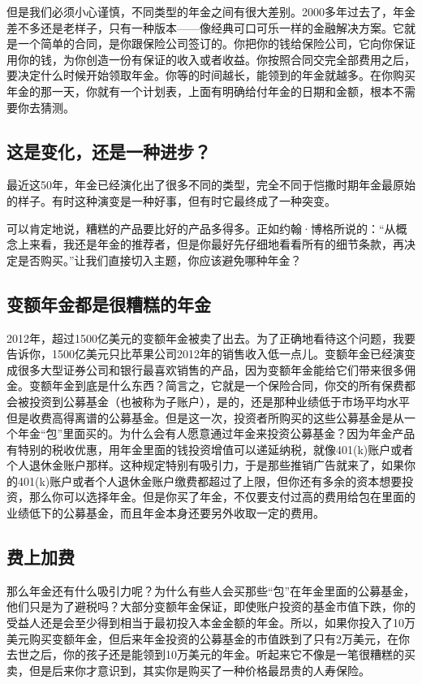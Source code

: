 但是我们必须小心谨慎，不同类型的年金之间有很大差别。2000多年过去了，年金差不多还是老样子，只有一种版本——像经典可口可乐一样的金融解决方案。它就是一个简单的合同，是你跟保险公司签订的。你把你的钱给保险公司，它向你保证用你的钱，为你创造一份有保证的收入或者收益。你按照合同交完全部费用之后，要决定什么时候开始领取年金。你等的时间越长，能领到的年金就越多。在你购买年金的那一天，你就有一个计划表，上面有明确给付年金的日期和金额，根本不需要你去猜测。

\subsection{这是变化，还是一种进步？}

最近这50年，年金已经演化出了很多不同的类型，完全不同于恺撒时期年金最原始的样子。有时这种演变是一种好事，但有时它最终成了一种突变。

可以肯定地说，糟糕的产品要比好的产品多得多。正如约翰·博格所说的：“从概念上来看，我还是年金的推荐者，但是你最好先仔细地看看所有的细节条款，再决定是否购买。”让我们直接切入主题，你应该避免哪种年金？

\subsection{变额年金都是很糟糕的年金}

2012年，超过1500亿美元的变额年金被卖了出去。为了正确地看待这个问题，我要告诉你，1500亿美元只比苹果公司2012年的销售收入低一点儿。变额年金已经演变成很多大型证券公司和银行最喜欢销售的产品，因为变额年金能给它们带来很多佣金。变额年金到底是什么东西？简言之，它就是一个保险合同，你交的所有保费都会被投资到公募基金（也被称为子账户），是的，还是那种业绩低于市场平均水平但是收费高得离谱的公募基金。但是这一次，投资者所购买的这些公募基金是从一个年金“包”里面买的。为什么会有人愿意通过年金来投资公募基金？因为年金产品有特别的税收优惠，用年金里面的钱投资增值可以递延纳税，就像401(k)账户或者个人退休金账户那样。这种规定特别有吸引力，于是那些推销广告就来了，如果你的401(k)账户或者个人退休金账户缴费都超过了上限，但你还有多余的资本想要投资，那么你可以选择年金。但是你买了年金，不仅要支付过高的费用给包在里面的业绩低下的公募基金，而且年金本身还要另外收取一定的费用。

\subsection{费上加费}

那么年金还有什么吸引力呢？为什么有些人会买那些“包”在年金里面的公募基金，他们只是为了避税吗？大部分变额年金保证，即使账户投资的基金市值下跌，你的受益人还是会至少得到相当于最初投入本金金额的年金。所以，如果你投入了10万美元购买变额年金，但后来年金投资的公募基金的市值跌到了只有2万美元，在你去世之后，你的孩子还是能领到10万美元的年金。听起来它不像是一笔很糟糕的买卖，但是后来你才意识到，其实你是购买了一种价格最昂贵的人寿保险。


